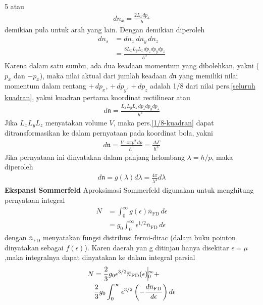 \documentclass[a4paper  , 6 pt]{article}
\begin{document}
\begin{tiny}
\begin{multicols} {5}
atau 
\begin{align}
d n_x = \frac{2 L_x d p_x }{h}
\end{align}
demikian pula untuk arah yang lain. \newline
Dengan demikian diperoleh
\begin{align}
dn_s& = d n_x \, d n_y \, d n_z \nonumber \\
& = \frac{8 L_x L_y L_z  \, d p_z d p_y d p_z}{h^3}  \label{seluruh kuadran}
\end{align}
Karena dalam satu sumbu, ada dua keadaan momentum yang dibolehkan, yakni  ($p_x$ dan $-p_x$), maka nilai aktual dari jumlah keadaan
 $d \mathfrak{n}$ yang memiliki nilai momentum dalam rentang $+ \, dp_x$, $+\, d p_y$, $+ \, d p_z$ adalah 1/8 dari nilai  pers.\ref{seluruh kuadran}, yakni kuadran pertama koordinat rectilinear  atau
 \begin{align}
 d \mathfrak{n} = \frac{L_x L_y L_z \, d p_z d p_y d p_z }{h^3} \label{1/8-kuadran}
 \end{align}
 Jika $L_x L_y L_z $ menyatakan volume $V$, maka
pers.\ref{1/8-kuadran} dapat ditransformasikan ke dalam pernyataan pada koordinat bola, yakni 
\begin{align}
d \mathfrak{n} =  \frac{V \cdot 4 \pi p^2  \, dp }{h^3}  = \frac{\Delta \Gamma}{h^3}
\end{align}
Jika pernyataan ini dinyatakan dalam panjang helombang $\lambda  = h/p$, maka diperoleh 
\begin{align}
d \mathfrak{ n} = g (\lambda ) d \lambda = \frac{4 \pi }{\lambda^4} d \lambda 
\end{align}
\textbf{Ekspansi Sommerfeld}
Aproksimasi Sommerfeld digunakan untuk menghitung pernyataan integral 
\begin{align}
N & = \int_{0}^{\infty} g(\epsilon) \overline{n}_\mathrm{FD} \, d \epsilon \nonumber \\
& = g_0 \int_{0}^{\infty} \epsilon^{1/2} \overline{n}_\mathrm{FD} \, d\epsilon 
\end{align}
dengan $\overline{n}_\mathrm{FD}$ menyatakan fungsi distribusi fermi-dirac (dalam buku pointon dinyatakan sebagai  $f(\epsilon)$). 
Karen daerah yan g ditinjau hanya disekitar $\epsilon = \mu $,maka integralnya dapat dinyatakan ke dalam integral parsial
\begin{align}
N  & = 
 \frac{2}{3} g_0 \epsilon^{3/2} \overline{n}_\mathrm{FD} (\epsilon)  \vline_{0}^{\infty} +  \nonumber \\
 &  \frac{2}{3} g_0 \int_0^\infty \epsilon^{3/2} \left( - \frac{d \overline{n}_\mathrm{FD}}{d \epsilon }\right) d \epsilon 

\end{align}
\end{multicols}
\end{tiny}
\end{document}
